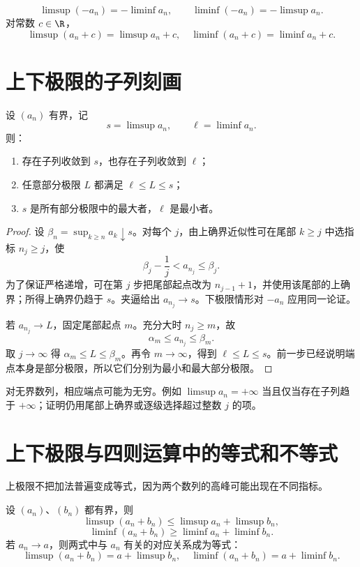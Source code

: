 \begin{proposition}
\[
 \limsup(-a_n)=-\liminf a_n,\qquad
 \liminf(-a_n)=-\limsup a_n.
\]
对常数 \(c\in\R\)，
\[
 \limsup(a_n+c)=\limsup a_n+c,
\quad
 \liminf(a_n+c)=\liminf a_n+c.
\]
\end{proposition}

\section{上下极限的子列刻画}

\begin{theorem}[有界数列的子列刻画]
设 \((a_n)\) 有界，记
\[
 s=\limsup a_n,\qquad \ell=\liminf a_n.
\]
则：
\begin{enumerate}
 \item 存在子列收敛到 \(s\)，也存在子列收敛到 \(\ell\)；
 \item 任意部分极限 \(L\) 都满足 \(\ell\le L\le s\)；
 \item \(s\) 是所有部分极限中的最大者，\(\ell\) 是最小者。
\end{enumerate}
\end{theorem}

\begin{proof}
设 \(\beta_n=\sup_{k\ge n}a_k\downarrow s\)。对每个 \(j\)，由上确界近似性可在尾部 \(k\ge j\) 中选指标 \(n_j\ge j\)，使
\[
 \beta_j-\frac1j<a_{n_j}\le\beta_j.
\]
为了保证严格递增，可在第 \(j\) 步把尾部起点改为 \(n_{j-1}+1\)，并使用该尾部的上确界；所得上确界仍趋于 \(s\)。夹逼给出 \(a_{n_j}\to s\)。下极限情形对 \(-a_n\) 应用同一论证。

若 \(a_{n_j}\to L\)，固定尾部起点 \(m\)。充分大时 \(n_j\ge m\)，故
\[
 \alpha_m\le a_{n_j}\le\beta_m.
\]
取 \(j\to\infty\) 得 \(\alpha_m\le L\le\beta_m\)。再令 \(m\to\infty\)，得到 \(\ell\le L\le s\)。前一步已经说明端点本身是部分极限，所以它们分别为最小和最大部分极限。
\end{proof}

对无界数列，相应端点可能为无穷。例如 \(\limsup a_n=+\infty\) 当且仅当存在子列趋于 \(+\infty\)；证明仍用尾部上确界或逐级选择超过整数 \(j\) 的项。

\section{上下极限与四则运算中的等式和不等式}

上极限不把加法普遍变成等式，因为两个数列的高峰可能出现在不同指标。

\begin{theorem}[和的上下极限不等式]
设 \((a_n)\)、\((b_n)\) 都有界，则
\[
 \limsup(a_n+b_n)
 \le\limsup a_n+\limsup b_n,
\]
\[
 \liminf(a_n+b_n)
 \ge\liminf a_n+\liminf b_n.
\]
若 \(a_n\to a\)，则两式中与 \(a_n\) 有关的对应关系成为等式：
\[
 \limsup(a_n+b_n)=a+\limsup b_n,
\quad
 \liminf(a_n+b_n)=a+\liminf b_n.
\]
\end{theorem}

